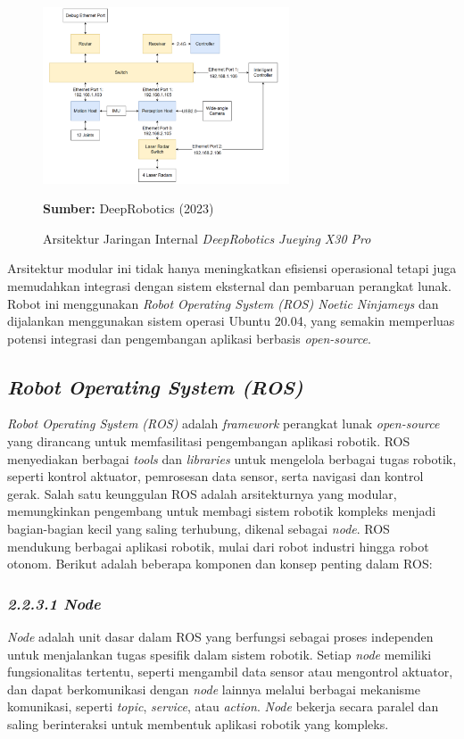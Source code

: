 \begin{figure}[H]
  \centering
  \includegraphics[width=0.65\textwidth]{gambar/bab2/network-x30.png}
  \caption{Arsitektur Jaringan Internal \emph{DeepRobotics Jueying X30 Pro}}
  \label{fig:network_architecture_x30pro}
  \footnotesize{\textbf{Sumber:} DeepRobotics (2023)}
\end{figure}


Arsitektur modular ini tidak hanya meningkatkan efisiensi operasional tetapi juga memudahkan integrasi dengan sistem eksternal dan pembaruan perangkat lunak. Robot ini menggunakan \emph{Robot Operating System (ROS) Noetic Ninjameys} dan dijalankan menggunakan sistem operasi Ubuntu 20.04, yang semakin memperluas potensi integrasi dan pengembangan aplikasi berbasis \emph{open-source}.


\subsection{\emph{Robot Operating System (ROS)}}
\emph{Robot Operating System (ROS)} adalah \emph{framework} perangkat lunak \emph{open-source} yang dirancang untuk memfasilitasi pengembangan aplikasi robotik. ROS menyediakan berbagai \emph{tools} dan \emph{libraries} untuk mengelola berbagai tugas robotik, seperti kontrol aktuator, pemrosesan data sensor, serta navigasi dan kontrol gerak. Salah satu keunggulan ROS adalah arsitekturnya yang modular, memungkinkan pengembang untuk membagi sistem robotik kompleks menjadi bagian-bagian kecil yang saling terhubung, dikenal sebagai \emph{node}. ROS mendukung berbagai aplikasi robotik, mulai dari robot industri hingga robot otonom. Berikut adalah beberapa komponen dan konsep penting dalam ROS:

\subsubsection{\emph{2.2.3.1 Node}}
\emph{Node} adalah unit dasar dalam ROS yang berfungsi sebagai proses independen untuk menjalankan tugas spesifik dalam sistem robotik. Setiap \emph{node} memiliki fungsionalitas tertentu, seperti mengambil data sensor atau mengontrol aktuator, dan dapat berkomunikasi dengan \emph{node} lainnya melalui berbagai mekanisme komunikasi, seperti \emph{topic}, \emph{service}, atau \emph{action}. \emph{Node} bekerja secara paralel dan saling berinteraksi untuk membentuk aplikasi robotik yang kompleks.

